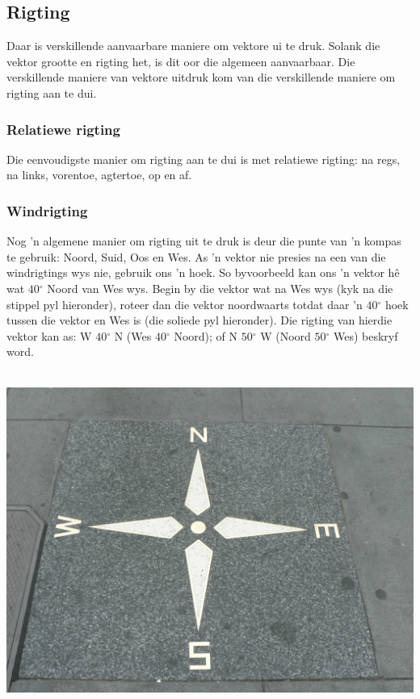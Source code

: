 \subsection*{Rigting}
            \nopagebreak
Daar is verskillende aanvaarbare maniere om vektore ui te druk. Solank die vektor grootte en rigting het, is dit oor die algemeen aanvaarbaar. Die verskillende maniere van vektore uitdruk kom van die verskillende maniere om rigting aan te dui.
      \label{m38812*uid5}
            \subsubsection*{Relatiewe rigting}
            \nopagebreak
Die eenvoudigste manier om rigting aan te dui is met relatiewe rigting: na regs, na links, vorentoe, agtertoe, op en af.
      \label{m38812*uid6}
            \subsubsection*{Windrigting}
            \nopagebreak
Nog  'n algemene manier om rigting uit te druk is deur die punte van  'n kompas te gebruik: Noord, Suid, Oos en Wes. As  'n vektor nie presies na een van die windrigtings wys nie, gebruik ons  'n hoek. So byvoorbeeld kan ons  'n vektor h\^{e} wat $40{}^{\circ }$ Noord van Wes wys. Begin by die vektor wat na Wes wys (kyk na die stippel pyl hieronder), roteer dan die vektor noordwaarts totdat daar  'n $40{}^{\circ }$ hoek tussen die vektor en Wes is (die soliede pyl hieronder). Die rigting van hierdie vektor kan as: W $40{}^{\circ }$ N (Wes $40{}^{\circ }$ Noord); of N $50{}^{\circ }$ W (Noord $50{}^{\circ }$ Wes) beskryf word.\\ \\
    \setcounter{subfigure}{0}
\begin{minipage}{.5\textwidth}
\begin{center}
\includegraphics[width=.4\textwidth]{photos/ecastro.jpg}
\end{center}
\end{minipage}
